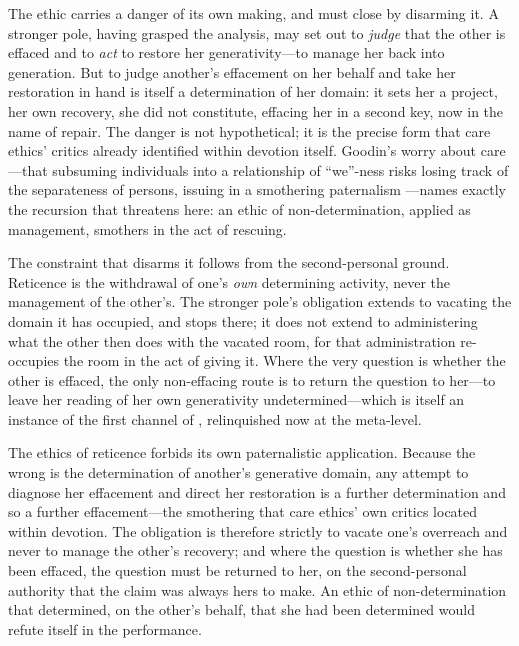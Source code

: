 The ethic carries a danger of its own making, and must close by disarming it. A stronger pole, having grasped the analysis, may set out to \emph{judge} that the other is effaced and to \emph{act} to restore her generativity---to manage her back into generation. But to judge another's effacement on her behalf and take her restoration in hand is itself a determination of her domain: it sets her a project, her own recovery, she did not constitute, effacing her in a second key, now in the name of repair. The danger is not hypothetical; it is the precise form that care ethics' critics already identified within devotion itself. Goodin's worry about care---that subsuming individuals into a relationship of ``we''-ness risks losing track of the separateness of persons, issuing in a smothering paternalism \parencite{goodin1985}---names exactly the recursion that threatens here: an ethic of non-determination, applied as management, smothers in the act of rescuing.

The constraint that disarms it follows from the second-personal ground. Reticence is the withdrawal of one's \emph{own} determining activity, never the management of the other's. The stronger pole's obligation extends to vacating the domain it has occupied, and stops there; it does not extend to administering what the other then does with the vacated room, for that administration re-occupies the room in the act of giving it. Where the very question is whether the other is effaced, the only non-effacing route is to return the question to her---to leave her reading of her own generativity undetermined---which is itself an instance of the first channel of , relinquished now at the meta-level.

\begin{claim}
The ethics of reticence forbids its own paternalistic application. Because the wrong is the determination of another's generative domain, any attempt to diagnose her effacement and direct her restoration is a further determination and so a further effacement---the smothering that care ethics' own critics located within devotion. The obligation is therefore strictly to vacate one's overreach and never to manage the other's recovery; and where the question is whether she has been effaced, the question must be returned to her, on the second-personal authority that the claim was always hers to make. An ethic of non-determination that determined, on the other's behalf, that she had been determined would refute itself in the performance.
\end{claim}
